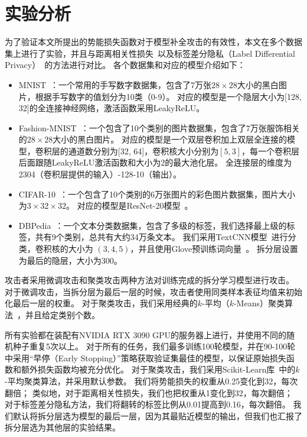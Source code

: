 \section{实验分析}
为了验证本文所提出的势能损失函数对于模型补全攻击的有效性，本文在多个数据集上进行了实验，并且与距离相关性损失~\cite{vepakomma2020nopeek,sunjiankai2022forward_embedding_protect}以及标签差分隐私（Label Differential Privacy）~\cite{wuruihan_2023_label_dp}的方法进行对比。
%
各个数据集和对应的模型介绍如下：
\begin{itemize}
    \item MNIST~\cite{mnist}：一个常用的手写数字数据集，包含了7万张$28\times 28$大小的黑白图片，根据手写数字的值划分为10类（0-9）。
    对应的模型是一个隐层大小为[128, 32]的全连接神经网络，激活函数采用LeakyReLU。
    
    \item Fashion-MNIST~\cite{fashion}：一个包含了10个类别的图片数据集，包含了7万张服饰相关的$28\times 28$大小的黑白图片。
    对应的模型是一个双层卷积加上双层全连接的模型，卷积层的通道数分别为[32, 64]，卷积核大小分别为$[5, 3]$，每一个卷积层后面跟随LeakyReLU激活函数和大小为2的最大池化层。
    全连接层的维度为2304（卷积层提供的输入）-128-10（输出）。
    
    \item CIFAR-10~\cite{krizhevsky_2009_cifar}：一个包含了10个类别的6万张图片的彩色图片数据集，图片大小为$3\times 32\times 32$。
    对应的模型是ResNet-20模型~\cite{hekaiming2016resnet}。

    \item DBPedia~\cite{2007dbpedia}：一个文本分类数据集，包含了多级的标签，我们选择最上级的标签，共有9个类别，总共有大约34万条文本。
    我们采用TextCNN模型~\cite{kimyoon2014textcnn}进行分类，卷积核的大小为 $(3,4,5)$，并且使用Glove预训练词向量~\cite{pennington2014glove}。
    拆分层设置为最后的隐层，大小为300。
\end{itemize}
%

攻击者采用微调攻击和聚类攻击两种方法对训练完成的拆分学习模型进行攻击。
对于微调攻击，当拆分层为最后一层的时候，攻击者使用同类样本表征均值来初始化最后一层的权重。
对于聚类攻击，我们采用经典的$k$-平均（$k$-Means）聚类算法~\cite{macqueen1967kmeans}，并且给定类别个数。

所有实验都在装配有NVIDIA RTX 3090 GPU的服务器上进行，并使用不同的随机种子重复5次以上。
%
对于所有的任务，我们最多训练100轮模型，并在90-100轮中采用“早停（Early Stopping）”策略获取验证集最佳的模型，以保证原始损失函数和额外损失函数均被充分优化。
%
对于聚类攻击，我们采用Scikit-Learn库~\cite{pedregosa_2011_scikit}中的$k$-平均聚类算法，并采用默认参数。
%
我们将势能损失的权重从0.25变化到32，每次翻倍；
类似地，对于距离相关性损失，我们也把权重从1变化到32，每次翻倍；
对于标签差分隐私方法，我们将翻转的标签比例从0.01提高到0.16，每次翻倍。
%
我们默认将拆分层选为模型的最后一层，因为其最贴近模型的输出，但我们也汇报了拆分层选为其他层的实验结果。
%



